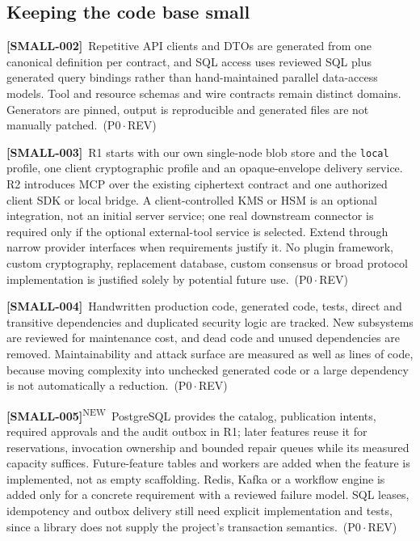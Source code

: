 \documentclass[11pt,a4paper]{article}
\newcommand{\code}[1]{{\small\nolinkurl{#1}}}
\newcommand{\reqtag}[2]{{\footnotesize\color{accent}(#1\,$\cdot$\,#2)}}
\newcommand{\req}[4]{\par\noindent\hypertarget{req:#1}{\textbf{[#1]}}\ #4\ \reqtag{#2}{#3}\par}
\newcommand{\reqn}[4]{\par\noindent\hypertarget{req:#1}{\textbf{[#1]}}\textsuperscript{\color{accent}\tiny NEW}\ #4\ \reqtag{#2}{#3}\par}
\begin{document}
\subsection{Keeping the code base small}
\req{SMALL-002}{P0}{REV}{Repetitive API clients and DTOs are generated from one canonical definition per contract, and SQL access uses reviewed SQL plus generated query bindings rather than hand-maintained parallel data-access models. Tool and resource schemas and wire contracts remain distinct domains. Generators are pinned, output is reproducible and generated files are not manually patched.}
\req{SMALL-003}{P0}{REV}{R1 starts with our own single-node blob store and the \code{local} profile, one client cryptographic profile and an opaque-envelope delivery service. R2 introduces MCP over the existing ciphertext contract and one authorized client SDK or local bridge. A client-controlled KMS or HSM is an optional integration, not an initial server service; one real downstream connector is required only if the optional external-tool service is selected. Extend through narrow provider interfaces when requirements justify it. No plugin framework, custom cryptography, replacement database, custom consensus or broad protocol implementation is justified solely by potential future use.}
\req{SMALL-004}{P0}{REV}{Handwritten production code, generated code, tests, direct and transitive dependencies and duplicated security logic are tracked. New subsystems are reviewed for maintenance cost, and dead code and unused dependencies are removed. Maintainability and attack surface are measured as well as lines of code, because moving complexity into unchecked generated code or a large dependency is not automatically a reduction.}
\reqn{SMALL-005}{P0}{REV}{PostgreSQL provides the catalog, publication intents, required approvals and the audit outbox in R1; later features reuse it for reservations, invocation ownership and bounded repair queues while its measured capacity suffices. Future-feature tables and workers are added when the feature is implemented, not as empty scaffolding. Redis, Kafka or a workflow engine is added only for a concrete requirement with a reviewed failure model. SQL leases, idempotency and outbox delivery still need explicit implementation and tests, since a library does not supply the project's transaction semantics.}
\end{document}
